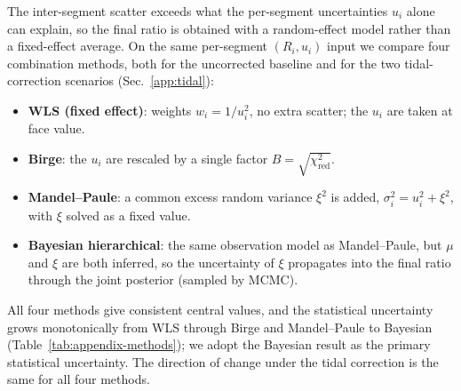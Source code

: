 \documentclass[11pt,a4paper]{article}
\begin{document}
The inter-segment scatter exceeds what the per-segment uncertainties
$u_i$ alone can explain, so the final ratio is obtained with a
random-effect model rather than a fixed-effect average. On the same
per-segment $(R_i, u_i)$ input we compare four combination methods, both
for the uncorrected baseline and for the two tidal-correction scenarios
(Sec.~\ref{app:tidal}):
\begin{itemize}
  \item \textbf{WLS (fixed effect)}: weights $w_i = 1/u_i^{2}$, no
        extra scatter; the $u_i$ are taken at face value.
  \item \textbf{Birge}: the $u_i$ are rescaled by a single factor
        $B = \sqrt{\chi^{2}_{\mathrm{red}}}$.
  \item \textbf{Mandel--Paule}: a common excess random variance
        $\xi^{2}$ is added, $\sigma_i^{2} = u_i^{2} + \xi^{2}$, with
        $\xi$ solved as a fixed value.
  \item \textbf{Bayesian hierarchical}: the same observation model as
        Mandel--Paule, but $\mu$ and $\xi$ are both inferred, so the
        uncertainty of $\xi$ propagates into the final ratio through the
        joint posterior (sampled by MCMC).
\end{itemize}
All four methods give consistent central values, and the statistical
uncertainty grows monotonically from WLS through Birge and Mandel--Paule
to Bayesian (Table~\ref{tab:appendix-methods}); we adopt the Bayesian
result as the primary statistical uncertainty. The direction of change
under the tidal correction is the same for all four methods.
\end{document}
